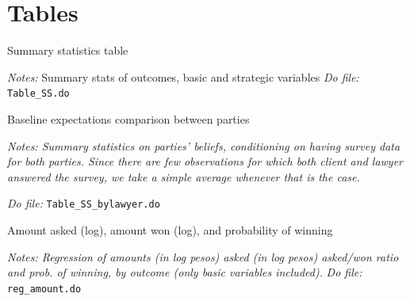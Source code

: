 \documentclass[11pt]{article}
\begin{document}



\pagebreak
\nocite{*}

%
%
\printbibliography



\section{Tables}


\begin{table}[H]
    \caption{Summary statistics table }
    \label{tab:SS}
    \begin{center}
        \tiny{}
    \end{center}
    \footnotesize
    \textit{Notes:} 
Summary stats of outcomes, basic and strategic variables
    \textit{Do file: } \texttt{Table\_SS.do}
\end{table}



\begin{table}[H]
    \caption{Baseline expectations comparison between parties}
    \label{Table_expectations_plaintiff_defendant}
    \begin{center}
       \scriptsize{}
    \end{center}
    \footnotesize    
    \textit{Notes: Summary statistics on parties' beliefs, conditioning on having survey data for both parties. Since there are few observations for which both client and lawyer answered the survey, we take a simple average whenever that is the case.} 
    
    \textit{Do file: } \texttt{Table\_SS\_bylawyer.do}
\end{table}

\pagebreak


\begin{table}[H]
    \caption{Amount asked (log), amount won (log), and probability of winning }
    \label{Table_Reg_winnings_log}
    \begin{center}
        \scriptsize{}
    \end{center}
    \footnotesize
    \textit{Notes: Regression of amounts (in log pesos) asked (in log pesos) asked/won ratio and prob. of winning, by outcome (only basic variables included).} 
    \textit{Do file: } \texttt{reg\_amount.do}
\end{table}
\end{document}

